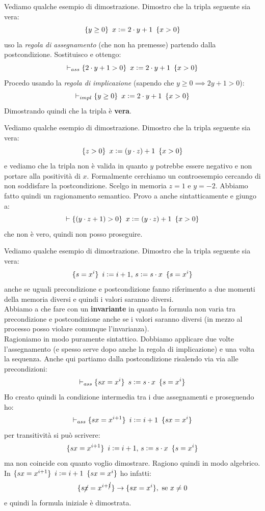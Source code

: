 \documentclass[a4paper,12pt, oneside]{book}
\def\cceq{\mathrel{\vcenter{\hbox{:}}{=}}}
\begin{document}
\begin{esempio}
  Vediamo qualche esempio di dimostrazione. Dimostro che la tripla seguente sia
  vera:
  \[\{y\geq 0\}\,\,\,x\cceq 2\cdot y+1\,\,\,\{x>0\}\]
  uso la \emph{regola di assegnamento} (che non ha premesse) partendo dalla
  postcondizione. Sostituisco e ottengo:
  \[\vdash_{ass}\{2\cdot y+1> 0\}\,\,\,x\cceq 2\cdot y+1\,\,\,\{x>0\}\]
  Procedo usando la \emph{regola di implicazione} (sapendo che $y\geq 0\implies
  2y+1>0$):
  \[\vdash_{impl}\{y\geq 0\}\,\,\,x\cceq 2\cdot y+1\,\,\,\{x>0\}\]
  Dimostrando quindi che la tripla è \textbf{vera}.
\end{esempio}
\begin{esempio}
  Vediamo qualche esempio di dimostrazione. Dimostro che la tripla seguente sia
  vera:
  \[\{z> 0\}\,\,\,x\cceq (y\cdot z)+1\,\,\,\{x>0\}\]
  e vediamo che la tripla non è valida in quanto $y$ potrebbe essere negativo e
  non portare alla positività di $x$. Formalmente cerchiamo un controesempio
  cercando di non soddisfare la postcondizione. Scelgo in memoria $z=1$ e
  $y=-2$. Abbiamo fatto quindi un ragionamento semantico. Provo a anche
  sintatticamente e giungo a:
  \[\vdash\{(y\cdot z+1)> 0\}\,\,\,x\cceq (y\cdot z)+1\,\,\,\{x>0\}\]
  che non è vero, quindi non posso proseguire.
\end{esempio}
\begin{esempio}
  Vediamo qualche esempio di dimostrazione. Dimostro che la tripla seguente sia
  vera:
  \[\{s=x^i\}\,\,\,i\cceq i+1,\, s\cceq s\cdot x\,\,\,\{s=x^i\}\]
  anche se uguali precondizione e postcondizione fanno riferimento a due momenti
  della memoria diversi e quindi i valori saranno diversi.\\
  Abbiamo a che fare con un \textbf{invariante} in quanto la formula non varia
  tra precondizione e postcondizione anche se i valori saranno diversi (in mezzo
  al processo posso violare comunque l'invarianza).\\
  Ragioniamo in modo puramente sintattico. Dobbiamo applicare due volte
  l'assegnamento (e spesso serve dopo anche la regola di implicazione) e una
  volta la sequenza. Anche qui partiamo dalla postcondizione risalendo via via
  alle precondizioni:
  \[\vdash_{ass}\{sx=x^i\}\,\,\,s\cceq s\cdot x\,\,\,\{s=x^i\}\]
  Ho creato quindi la condizione intermedia tra i due assegnamenti e proseguendo
  ho:
  \[\vdash_{ass}\{sx=x^{i+1}\}\,\,\,i\cceq i+1\,\,\,\{sx=x^i\}\]
  per transitività si può scrivere:
  \[\{sx=x^{i+1}\}\,\,\,i\cceq i+1,\, s\cceq s\cdot x\,\,\,\{s=x^i\}\]
  ma non coincide con quanto voglio dimostrare. Ragiono quindi in modo
  algebrico. In $\{sx=x^{i+1}\}\,\,\,i\cceq i+1\,\,\,\{sx=x^i\}$ ho infatti:
  \[\{s\cancel{x}=x^{i+\cancel{1}}\}\to\{sx=x^i\},\mbox{ se }x\neq 0\]
  e quindi la formula iniziale è dimostrata.
\end{esempio}
\end{document}
